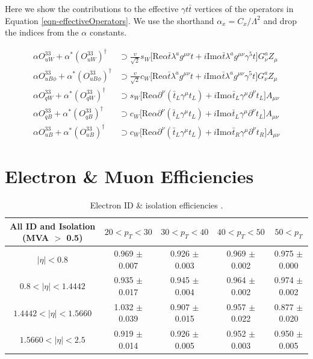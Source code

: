 \documentclass[oneside, a4paper, 11pt, ]{report}
\begin{document}
Here we show the contributions to the effective $\gamma t \bar{t}$ vertices of the operators in Equation \ref{eqn-effectiveOperators}. We use the shorthand $\alpha_x = C_x/\Lambda^2$ and drop the indices from the $\alpha$ constants.

\begin{align}
\alpha O^{33}_{uW} + \alpha^* (O^{33}_{uW})^{\dagger} & \supset \frac{v}{\sqrt{2}}s_W \lbrack \text{Re} \alpha\bar{t}\lambda^a g^{\mu \nu} t + i \text{Im} \alpha \bar{t}\lambda^a g^{\mu \nu} \gamma^5 t\rbrack G^a_{\nu} Z_{\mu}\\ 
\alpha O^{33}_{uB\phi} + \alpha^* (O^{33}_{uB\phi})^{\dagger} & \supset \frac{v}{\sqrt{2}}c_W \lbrack \text{Re} \alpha\bar{t}\lambda^a g^{\mu \nu} t + i \text{Im} \alpha \bar{t}\lambda^a g^{\mu \nu} \gamma^5 t\rbrack G^a_{\nu} Z_{\mu}\\ 
\alpha O^{33}_{qW} + \alpha^* (O^{33}_{qW})^{\dagger} & \supset s_W \lbrack \text{Re} \alpha\partial^{\nu}(\bar{t}_L\gamma^{\mu}t_L) + i \text{Im} \alpha \bar{t}_L\gamma^{\mu}\partial^{\nu}t_L \rbrack A_{\mu \nu}\\ 
\alpha O^{33}_{qB} + \alpha^* (O^{33}_{qB})^{\dagger} & \supset c_W \lbrack \text{Re} \alpha\partial^{\nu}(\bar{t}_L\gamma^{\mu}t_L) + i \text{Im} \alpha \bar{t}_L\gamma^{\mu}\partial^{\nu}t_L \rbrack A_{\mu \nu}\\ 
\alpha O^{33}_{uB} + \alpha^* (O^{33}_{uB})^{\dagger} & \supset c_W \lbrack \text{Re} \alpha\partial^{\nu}(\bar{t}_L\gamma^{\mu}t_L) + i \text{Im} \alpha \bar{t}_R\gamma^{\mu}\partial^{\nu}t_R \rbrack A_{\mu \nu}  
\end{align}

\section{Electron \& Muon Efficiencies}

\begin{table} 
\begin{center}
\resizebox{\columnwidth}{!} {
\begin{tabular}{|c|c|c|c|c|}
\hline
	\textbf{All ID and Isolation (MVA $>$ 0.5)} & $20 < p_T < 30$ & $30 < p_T < 40$ & $40 < p_T < 50$ & $50 < p_T$ \\
\hline	
	$|\eta| < 0.8$ & 0.969 $\pm$ 0.007 & 0.926 $\pm$ 0.003 & 0.969 $\pm$ 0.002 & 0.975 $\pm$ 0.000 \\
	$0.8 < |\eta| < 1.4442$ & 0.935 $\pm$ 0.017 & 0.945 $\pm$ 0.004 & 0.964 $\pm$ 0.002 & 0.974 $\pm$ 0.002 \\
	$1.4442 < |\eta| < 1.5660$ & 1.032 $\pm$ 0.039 & 0.907 $\pm$ 0.015 & 0.957 $\pm$ 0.022 & 0.877 $\pm$ 0.020 \\
	$1.5660 < |\eta| < 2.5$ & 0.919 $\pm$ 0.014 & 0.926 $\pm$ 0.005 & 0.952 $\pm$ 0.003 & 0.950 $\pm$ 0.005 \\
\hline	
\end{tabular}
}
\end{center}
\caption{Electron ID \& isolation efficiencies \cite{ElectronEfficiencies}.}
\label{tab-ElectronEfficiencies}
\end{table}
\end{document}
